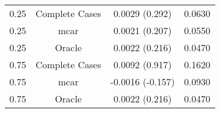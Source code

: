 \begin{table}[ht]
\centering
\begin{tabular}{cccc}
  \hline
  \hline
0.25 & Complete Cases & 0.0029 (0.292) & 0.0630 \\ 
  0.25 & mcar & 0.0021 (0.207) & 0.0550 \\ 
  0.25 & Oracle & 0.0022 (0.216) & 0.0470 \\ 
  0.75 & Complete Cases & 0.0092 (0.917) & 0.1620 \\ 
  0.75 & mcar & -0.0016 (-0.157) & 0.0930 \\ 
  0.75 & Oracle & 0.0022 (0.216) & 0.0470 \\ 
   \hline
\end{tabular}
\end{table}
